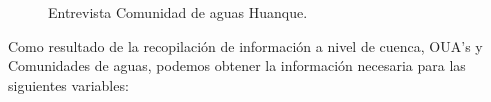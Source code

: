 \documentclass[]{article}
\begin{document}
\begin{figure} [H]
	\caption{Entrevista Comunidad de aguas Huanque.}
\end{figure}

Como resultado de la recopilación de información a nivel de cuenca, OUA's y Comunidades de aguas, podemos obtener la información necesaria para las siguientes variables:
\end{document}
